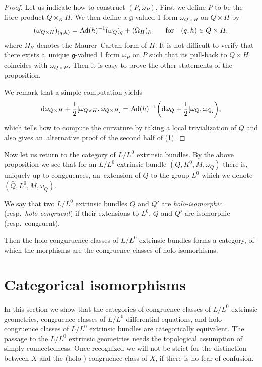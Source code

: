 \documentclass[10pt,a4paper]{amsart}
\newcommand{\g}{\mathfrak g}
\numberwithin{equation}{section}
\begin{document}
\begin{proof} Let us indicate how to construct $(P, \omega_P)$.
First we define $P$ to be the fibre product
$Q\times _K H $. We then define a $\g$-valued 1-form $\omega_{Q\times H}$
on $Q\times H$ by
\[
 ( \omega_{Q \times H} ) _{(q, h)} = {\rm Ad}(h) ^{-1} (\omega_Q)_q + (\Omega _H )_h \qquad \text{for}\quad (q, h) \in Q\times H,
\]
where $\Omega_H$ denotes the Maurer--Cartan form of $H$. It is not difficult to verify that there exists a~unique $\g$-valued 1 form
$\omega_P$ on $P$ such that its pull-back to $Q\times H$ coincides with
$\omega_{Q\times H}$. Then it is easy to prove the other statements of the proposition.

We remark that a simple computation yields
\[
{\rm d}\omega_{Q\times H} +\frac12 [ \omega_{Q\times H}, \omega_{Q\times H} ]
={\rm Ad}(h)^{-1} \bigg({\rm d}\omega_Q +\frac12[\omega_Q, \omega_Q]\bigg),
\]
which tells how to compute the curvature by taking a local trivialization of $Q$ and also gives an~alternative proof of the second half of (1).
\end{proof}


Now let us return to the category of $L/L^0$ extrinsic bundles.
By the above proposition we see that for an $L/L^0$ extrinsic bundle $\left(Q, K^0, M, \omega_Q\right)$ there is, uniquely up to congruences, an~extension of $Q$ to the group
$L^0$ which we denote $\left(\bar Q, L^0, M, \omega_{\bar Q}\right)$.

We say that two $L/ L^0$ extrinsic bundles $Q$ and $Q'$ are
\emph{holo-isomorphic} (resp.\ \emph{holo-congruent}) if their extensions to $L^0$, $\bar Q$ and $\bar Q'$ are isomorphic (resp.\ congruent).

Then the holo-conguruence classes of $L/L^0$ extrinsic bundles
forms a category, of which the morphisms are the congruence classes of
holo-isomorhisms.\vspace{-1.5mm}


\section{Categorical isomorphisms}
\label{sec4}

In this section we show that the categories of congruence classes of $L/L^0$ extrinsic geometries, congruence classes of $L/L^0$ differential equations, and holo-congruence classes of $L/L^0$ extrinsic bundles are categorically equivalent. The passage to the $L/L^0$ extrinsic geometries needs the topological assumption of simply connectedness. Once recognized we will not be strict for the distinction between $X$ and the (holo-) congruence class of $X$, if there is no fear of confusion.
\vspace{-1mm}
\end{document}
